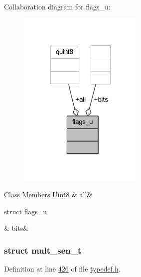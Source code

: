 Collaboration diagram for flags\+\_\+u\+:
\nopagebreak
\begin{figure}[H]
\begin{center}
\leavevmode
\includegraphics[width=170pt]{d6/d08/a00244}
\end{center}
\end{figure}
\begin{DoxyFields}{Class Members}
\hypertarget{a00001_a52b54576648e86d4539fda3590d7bbd3}{\hyperlink{a00001_a979e3e23b9a449e69ab6a8a83b6042f8}{Uint8}}\label{a00001_a52b54576648e86d4539fda3590d7bbd3}
&
all&
\\
\hline

\hypertarget{a00001_a34f54267c35940f96f5787cea3f81dfc}{struct \hyperlink{a00001_d9/da5/a00075}{flags\+\_\+u}}\label{a00001_a34f54267c35940f96f5787cea3f81dfc}
&
bits&
\\
\hline

\end{DoxyFields}
\label{db/ddf/a00088}
\hypertarget{a00001_db/ddf/a00088}{}
\subsubsection{struct mult\+\_\+sen\+\_\+t}


Definition at line \hyperlink{a00001_source_l00426}{426} of file \hyperlink{a00001_source}{typedef.\+h}.



